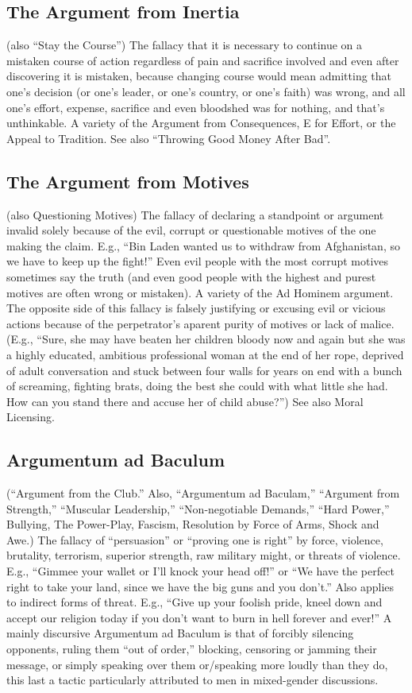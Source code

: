 \documentclass[10pt,a4paper,british]{article}
\begin{document}
\begin{multicols}{2}
    \subsection{The Argument from Inertia} (also “Stay the Course”) The fallacy that it is necessary to continue on a mistaken course of action regardless of pain and sacrifice involved  and even after discovering it is mistaken, because changing course would mean admitting that one's decision (or one's leader, or one's country, or one's faith) was wrong, and all one's effort, expense, sacrifice and even bloodshed was for nothing, and that's unthinkable. A variety of the Argument from Consequences, E for Effort, or the Appeal to Tradition. See also ``Throwing Good Money After Bad''.  

	\subsection{The Argument from Motives} (also Questioning Motives) The fallacy of declaring a standpoint or argument invalid solely because of the evil, corrupt or questionable motives of the one making the claim. E.g., ``Bin Laden wanted us to withdraw from Afghanistan, so we have to keep up the fight!'' Even evil people with the most corrupt motives sometimes say the truth (and even good people with the highest and purest motives are often wrong or mistaken). A variety of the Ad Hominem argument. The opposite side of this fallacy is falsely justifying or excusing evil or vicious actions because of the perpetrator's aparent purity of motives or lack of malice.  (E.g., ``Sure, she may have beaten her children bloody now and again but she was a highly educated, ambitious professional woman at the end of her rope, deprived of adult conversation and stuck between four walls for years on end with a bunch of screaming, fighting brats, doing the best she could with what little she had. How can you stand there and accuse her of child abuse?'') See also Moral Licensing.  

	\subsection{Argumentum ad Baculum} (``Argument from the Club.'' Also, ``Argumentum ad Baculam,'' ``Argument from Strength,'' ``Muscular Leadership,'' ``Non{-}negotiable Demands,'' ``Hard Power,'' Bullying, The Power{-}Play, Fascism, Resolution by Force of Arms, Shock and Awe.) The fallacy of ``persuasion'' or ``proving one is right'' by force, violence, brutality, terrorism, superior strength, raw military might, or threats of violence. E.g., ``Gimmee your wallet or I'll knock your head off!'' or ``We have the perfect right to take your land, since we have the big guns and you don't.'' Also applies to indirect forms of threat. E.g., ``Give up your foolish pride, kneel down and accept our religion today if you don't want to burn in hell forever and ever!'' A mainly discursive Argumentum ad Baculum is that of forcibly silencing opponents, ruling them ``out of order,'' blocking, censoring or jamming their message, or simply speaking over them or/speaking more loudly than they do, this last a tactic particularly attributed to men in mixed{-}gender discussions.  


\end{multicols}
\end{document}
